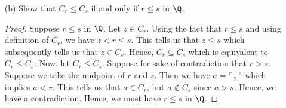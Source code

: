 \begin{enumerate}
\begin{proof}
   Now, we show the reverse inclusion. Suppose \( x \in C_{rs} \), then \( x < rs \) for \( r,s \geq 0  \) in \( \Q  \). Suppose \( r,s > 0  \) (if \( r,s = 0  \) then the result follows immediately), then dividing by \( r  \) on both sides gives us \( x /r  < s   \) which tells us that \( x / r \in C_{s}  \). Similarly, we can divide by \(  s  \) to get \( x / s < r  \) which implies \( x / s \in C_{r}  \). Hence, taking the product of these two elements leads to 
   \[  \frac{ x }{ s }  \cdot \frac{ x }{ r }  < (rs)^{2} \iff \frac{ x  }{ s^{2}  } \cdot \frac{ x  }{ r^{2} } < rs . \] Hence, we must have \( x \in C_{r}C_{s} \) and thus we have \(  C_{rs } \subseteq C_{r}C_{s} \). 
        \end{proof}
    \item[(b)] Show that \( C_{r} \leq C_{s}  \) if and only if \( r \leq s  \) in \( \Q  \).
        \begin{proof}
        Suppose \( r \leq s  \) in \( \Q  \). Let \( z \in C_{r}  \). Using the fact that \( r \leq s  \) and using definition of \( C_{r}  \), we have \( z < r \leq s   \). This tells us that \( z \leq s  \) which subsequently tells us that \( z \in C_{s}   \). Hence, \( C_{r } \subseteq C_{s}  \) which is equivalent to \( C_{r} \leq C_{s} \). Now, let \( C_{r} \leq C_{s}  \). Suppose for sake of contradiction that \( r > s  \). Suppose we take the midpoint of \( r  \) and \( s \). Then we have \( a = \frac{ r+s }{ 2 }  \) which implies \( a < r  \). This tells us that \( a \in C_{r} \), but \( a \notin C_{s} \) since \( a > s  \). Hence, we have a contradiction. Hence, we must have \( r \leq s  \) in \( \Q  \).      
        \end{proof}
\end{enumerate}


